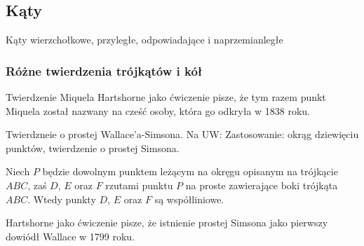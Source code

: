 \subsection{Kąty}
Kąty wierzchołkowe, przyległe, odpowiadające i naprzemianległe
\loremipsum








\subsubsection{Różne twierdzenia trójkątów i kół}
Twierdzenie Miquela
\loremipsum
Hartshorne jako ćwiczenie \cite[s. 61]{hartshorne2000} pisze, że tym razem punkt Miquela został nazwany na cześć osoby, która go odkryła w 1838 roku.

Twierdzneie o prostej Wallace'a-Simsona.
Na UW: Zastosowanie: okrąg dziewięciu punktów, twierdzenie o prostej Simsona.

\begin{proposition}
	Niech $P$ będzie dowolnym punktem leżącym na okręgu opisanym na trójkącie $ABC$, zaś $D$, $E$ oraz $F$ rzutami punktu $P$ na proste zawierające boki trójkąta $ABC$.
	Wtedy punkty $D$, $E$ oraz $F$ są współliniowe.
\end{proposition}

Hartshorne jako ćwiczenie \cite[s. 61]{hartshorne2000} pisze, że istnienie prostej Simsona jako pierwszy dowiódł Wallace w 1799 roku.